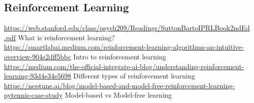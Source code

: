 \documentclass{article}
\begin{document}
    \subsection{Reinforcement Learning}
    \noindent \url{https://web.stanford.edu/class/psych209/Readings/SuttonBartoIPRLBook2ndEd.pdf} What is reinforcement learning?\\
    \noindent \url{https://smartlabai.medium.com/reinforcement-learning-algorithms-an-intuitive-overview-904e2dff5bbc} Intro to reinforcement learning\\
    \noindent \url{https://medium.com/the-official-integrate-ai-blog/understanding-reinforcement-learning-93d4e34e5698} Different types of reinforcement learning\\
    \noindent \url{https://neptune.ai/blog/model-based-and-model-free-reinforcement-learning-pytennis-case-study} Model-based vs Model-free learning\\
\end{document}
